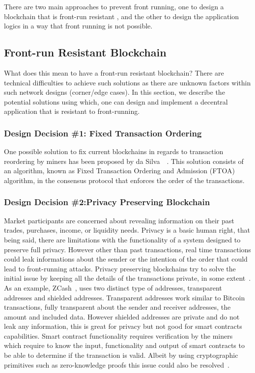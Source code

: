 There are two main approaches to prevent front running, one to design a blockchain that is front-run resistant , and the other to design the application logics in a way that front running is not possible. 

\subsection{Front-run Resistant Blockchain}
What does this mean to have a front-run resistant blockchain?  There are technical difficulties to achieve such solutions as there are unknown factors within such network designs (corner/edge cases). In this section, we describe the potential solutions using which, one can design and implement a decentral application that is resistant to front-running.

\subsubsection{Design Decision \#1: Fixed Transaction Ordering\newline}

One possible solution to fix current blockchains in regards to transaction reordering by miners has been proposed by da Silva~\etal~\cite{fixedordering2018silva}. This solution consists of an algorithm, known as Fixed Transaction Ordering and Admission (FTOA) algorithm, in the consensus protocol that enforces the order of the transactions. 

\subsubsection{Design Decision \#2:Privacy Preserving Blockchain\newline}

Market participants are concerned about revealing information on their past trades, purchases, income, or liquidity needs. Privacy is a basic human right, that being said, there are limitations with the functionality of a system designed to preserve full privacy. However other than past transactions, real time transactions could leak informations about the sender or the intention of the order that could lead to front-running attacks. Privacy preserving blockchains try to solve the initial issue by keeping all the details of the transactions private, in some extent~\cite{miller2017empirical, kappos2018empirical}. 
As an example, ZCash~\cite{hopwood2016zcash}, uses two distinct type of addresses, transparent addresses and shielded addresses. Transparent addresses work similar to Bitcoin transactions, fully transparent about the sender and receiver addresses, the amount and included data. However shielded addresses are private and do not leak any information, this is great for privacy but not good for smart contracts capabilities. Smart contract functionality requires verification by the miners which require to know the input, functionality and output of smart contracts to be able to determine if the transaction is valid. Albeit by using cryptographic primitives such as zero-knowledge proofs this issue could also be resolved~\cite{kosba2016hawk}. 



